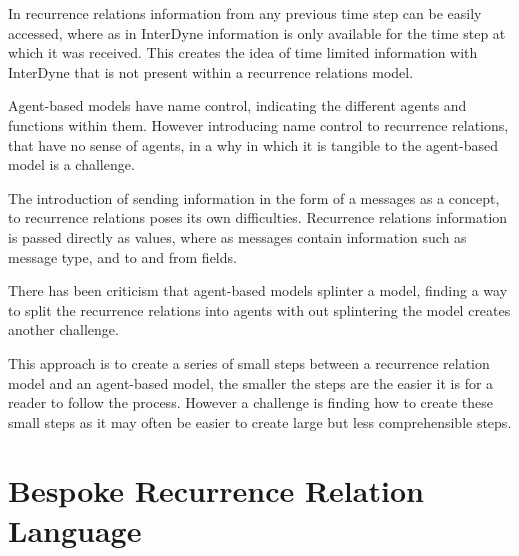 \documentclass{article}
\begin{document}
In recurrence relations information from any previous time step can be easily accessed, where as in InterDyne information is only available for the time step at which it was received. This creates the idea of time limited information with InterDyne that is not present within a recurrence relations model.   

Agent-based models have name control, indicating the different agents and functions within them. However introducing name control to  recurrence relations, that have no sense of agents, in a why in which it is tangible to the agent-based model is a challenge. 

The introduction of sending information in the form of a messages as a concept, to recurrence relations poses its own difficulties. Recurrence relations information is passed directly as values, where as messages contain information such as message type, and to and from fields. 

There has been criticism that agent-based models splinter a model, finding a way to split the recurrence relations into agents with out splintering the model creates another challenge. 

This approach is to create a series of small steps between a recurrence relation model and an agent-based model, the smaller the steps are the easier it is for a reader to follow the process. However a challenge is finding how to create these small steps as it may often be easier to create large but less comprehensible steps.   









\section{Bespoke Recurrence Relation Language} \label{beskoperecurrancerealtion}


\end{document}
